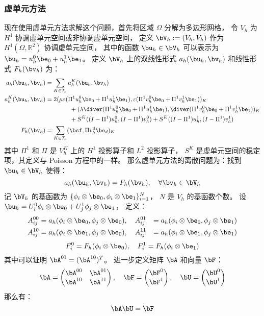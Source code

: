 \subsubsection{虚单元方法}
现在使用虚单元方法求解这个问题，首先将区域 $\Omega$ 分解为多边形网格，
令 $V_h$ 为 $H^1$ 协调虚单元空间或非协调虚单元空间，
定义 $\bV_h := (V_h, V_h)$ 作为 $H^1(\Omega, \mathbb{R}^2)$ 协调虚单元空间，
其中的函数 $\bu_h \in \bV_h$ 可以表示为 $\bu_h = u_h^0\be_0 + u_h^1\be_1$。 
定义 $\bV_h$ 上的双线性形式 $a_h(\bu_h, \bv_h)$ 和线性形式 $F_h(\bv_h)$ 为：
$$
\begin{aligned}
    a_h(\bu_h, \bv_h) & = \sum_{K \in \mathcal{T}_h}a_h^K(\bu_h, \bv_h)\\
    a_h^K(\bu_h, \bv_h) & = 2(\mu\varepsilon(\Pi^1 u_h^0 \be_0 + \Pi^1 u_h^1 \be_1), 
    \varepsilon(\Pi^1 v_h^0 \be_0 + \Pi^1 v_h^1 \be_1))_K\\
    & \qquad\qquad + (\lambda\diver (\Pi^1 u_h^0 \be_0 + \Pi^1 u_h^1 \be_1), \diver(\Pi^1 v_h^0
    \be_0 + \Pi^1 v_h^1 \be_1))_K\\ 
    & \qquad\qquad + S^K((I - \Pi^1)u_h^0, (I - \Pi^1)v_h^0) + S^K((I -
    \Pi^1)u_h^1, (I - \Pi^1)v_h^1)\\
    F_h(\bv_h) & = \sum_{K\in \mathcal{T}_h}(\bsf, \Pi v_h^d \be_d)_K
\end{aligned}
$$
其中 $\Pi^1$ 和 $\Pi$ 是 $V_h^K$ 上的 $H^1$ 投影算子和 $L^2$ 投影算子，
$S^K$ 是虚单元空间的稳定项，其定义与
Poisson 方程中的一样。
那么虚单元方法的离散问题为：找到 $\bu_h \in \bV_h$ 使得：
$$
a_h(\bu_h, \bv_h) = F_h(\bv_h), \quad \forall \bv_h \in \bV_h
$$
记 $\bV_h$ 的基函数为 $\{\phi_i\otimes \be_0, \phi_i\otimes \be_1\}_{i=1}^{N}$， 
$N$ 是 $V_h$ 的基函数个数。
设 $\bu_h = U_i^0 \phi_i\otimes \be_0 + U_j^1 \phi_j\otimes \be_1$，
定义：
\begin{equation}
\label{eq:elasticmatrixij}
\begin{aligned}
    A_{ij}^{00} & = a_h(\phi_i\otimes \be_0, \phi_j\otimes \be_0), \quad 
    A_{ij}^{01} & = a_h(\phi_i\otimes \be_0, \phi_j\otimes \be_1)\\
    A_{ij}^{10} & = a_h(\phi_i\otimes \be_1, \phi_j\otimes \be_0), \quad
    A_{ij}^{11} & = a_h(\phi_i\otimes \be_1, \phi_j\otimes \be_1)\\
\end{aligned}
\end{equation}
$$
F_i^0 = F_h(\phi_i\otimes \be_0), \quad F_i^1 = F_h(\phi_i\otimes \be_1)
$$
其中可以证明 $\bA^{01} = (\bA^{10})^T$。
进一步定义矩阵 $\bA$ 和向量 $\bF$：
$$
\bA =
\begin{pmatrix}
    \bA^{00} & \bA^{01}\\
    \bA^{10} & \bA^{11}
\end{pmatrix}, \quad
\bF =
\begin{pmatrix}
    \bF^{0}\\
    \bF^{1}
\end{pmatrix}, \quad
\bU =
\begin{pmatrix}
    \bU^{0}\\
    \bU^{1}
\end{pmatrix}
$$
那么有：
$$
\bA \bU = \bF
$$

